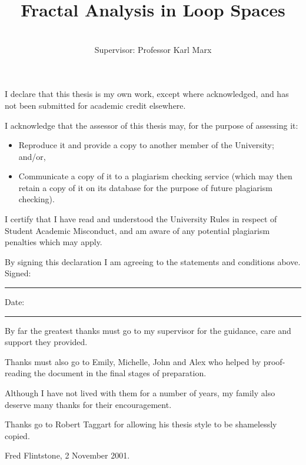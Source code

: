 \documentclass[mstat,12pt]{unswthesis}  %
\title{Fractal Analysis in Loop Spaces}
\author{\Authornameonly\\{\bigskip}Supervisor: Professor Karl Marx}
\newcommand\blankpage{%
    \null
    \thispagestyle{empty}%
    \addtocounter{page}{-1}%
    \newpage}
\numberwithin{equation}{section}
\begin{document}
\beforepreface

\afterpage{\blankpage}



\vskip 10pc \noindent I declare that this thesis is my
own work, except where acknowledged, and has not been submitted for
academic credit elsewhere. 

\vskip 2pc  \noindent I acknowledge that the assessor of this
thesis may, for the purpose of assessing it:
\begin{itemize}
\item Reproduce it and provide a copy to another member of the University; and/or,
\item Communicate a copy of it to a plagiarism checking service (which may then retain a copy of it on its database for the purpose of future plagiarism checking).
\end{itemize}

\vskip 2pc \noindent I certify that I have read and understood the University Rules in
respect of Student Academic Misconduct, and am aware of any potential plagiarism penalties which may 
apply.\vspace{24pt}

\vskip 2pc \noindent By signing 
this declaration I am
agreeing to the statements and conditions above.
\vskip 2pc \noindent
Signed: \rule{7cm}{0.25pt} \hfill Date: \rule{4cm}{0.25pt} \newline
\vskip 1pc

\afterpage{\blankpage}




{\bigskip}By far the greatest thanks must go to my supervisor for
the guidance, care and support they provided. 

{\bigskip\noindent}Thanks 
must also go to Emily, Michelle, John and Alex who helped by
proof-reading the document in the final stages of preparation.

{\bigskip\noindent}Although
I have not lived with them for a number of years, my family also deserve
many thanks for their encouragement.

{\bigskip\noindent} Thanks go to Robert Taggart for allowing his thesis
style to be shamelessly copied.

{\bigskip\bigskip\bigskip\noindent} Fred Flintstone, 2 November 2001.

\afterpage{\blankpage}
\end{document}
